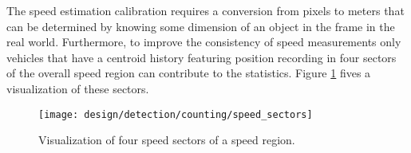 The speed estimation calibration requires a conversion from pixels to meters that can be determined by knowing some dimension of an object in the frame in the real world. Furthermore, to improve the consistency of speed measurements only vehicles that have a centroid history featuring position recording in four sectors of the overall speed region can contribute to the statistics. Figure \ref{fig:speed_sectors} fives a visualization of these sectors.

\begin{figure}[H]
	\centering
	\centering\texttt{[image: design/detection/counting/speed\_sectors]}
	\caption{Visualization of four speed sectors of a speed region.}
	\label{fig:speed_sectors}
  \end{figure}
  